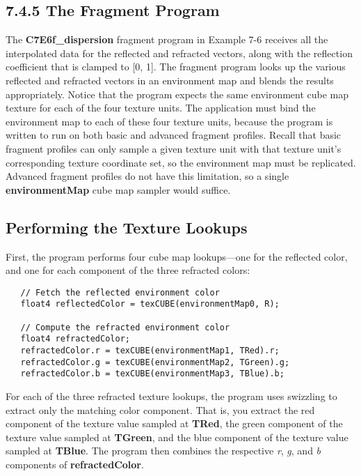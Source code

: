 \documentclass[../main.tex]{subfiles}
\begin{document}
\subsection{7.4.5 The Fragment Program}

The \textbf{C7E6f_dispersion} fragment program in Example 7-6 receives all the interpolated data for the reflected and refracted vectors, along with the reflection coefficient that is clamped to [0, 1]. The fragment program looks up the various reflected and refracted vectors in an environment map and blends the results appropriately. Notice that the program expects the same environment cube map texture for each of the four texture units. The application must bind the environment map to each of these four texture units, because the program is written to run on both basic and advanced fragment profiles. Recall that basic fragment profiles can only sample a given texture unit with that texture unit's corresponding texture coordinate set, so the environment map must be replicated. Advanced fragment profiles do not have this limitation, so a single \textbf{environmentMap} cube map sampler would suffice.

\subsection*{Performing the Texture Lookups}

First, the program performs four cube map lookups—one for the reflected color, and one for each component of the three refracted colors:

\FloatBarrier
\begin{lstlisting}
   // Fetch the reflected environment color
   float4 reflectedColor = texCUBE(environmentMap0, R);

   // Compute the refracted environment color
   float4 refractedColor;
   refractedColor.r = texCUBE(environmentMap1, TRed).r;
   refractedColor.g = texCUBE(environmentMap2, TGreen).g;
   refractedColor.b = texCUBE(environmentMap3, TBlue).b;
\end{lstlisting}
\FloatBarrier

For each of the three refracted texture lookups, the program uses swizzling to extract only the matching color component. That is, you extract the red component of the texture value sampled at \textbf{TRed}, the green component of the texture value sampled at \textbf{TGreen}, and the blue component of the texture value sampled at \textbf{TBlue}. The program then combines the respective \textit{r}, \textit{g}, and \textit{b} components of \textbf{refractedColor}.
\end{document}

